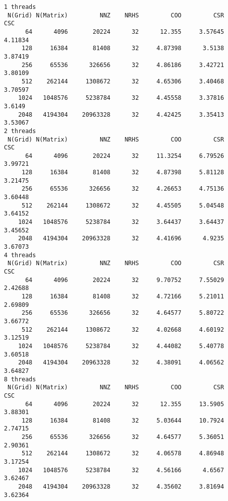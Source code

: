 \documentclass[]{article}
\begin{document}
    \begin{lstlisting}
1 threads   
 N(Grid) N(Matrix)         NNZ    NRHS         COO         CSR         CSC
      64      4096       20224      32      12.355     3.57645     4.11834
     128     16384       81408      32     4.87398      3.5138     3.87419
     256     65536      326656      32     4.86186     3.42721     3.80109
     512    262144     1308672      32     4.65306     3.40468     3.70597
    1024   1048576     5238784      32     4.45558     3.37816      3.6149
    2048   4194304    20963328      32     4.42425     3.35413     3.53067
2 threads   
 N(Grid) N(Matrix)         NNZ    NRHS         COO         CSR         CSC
      64      4096       20224      32     11.3254     6.79526     3.99721
     128     16384       81408      32     4.87398     5.81128     3.21475
     256     65536      326656      32     4.26653     4.75136     3.60448
     512    262144     1308672      32     4.45505     5.04548     3.64152
    1024   1048576     5238784      32     3.64437     3.64437     3.45652
    2048   4194304    20963328      32     4.41696      4.9235     3.67073
4 threads   
 N(Grid) N(Matrix)         NNZ    NRHS         COO         CSR         CSC
      64      4096       20224      32     9.70752     7.55029     2.42688
     128     16384       81408      32     4.72166     5.21011     2.69809
     256     65536      326656      32     4.64577     5.80722     3.66772
     512    262144     1308672      32     4.02668     4.60192     3.12519
    1024   1048576     5238784      32     4.44082     5.40778     3.60518
    2048   4194304    20963328      32     4.38091     4.06562     3.64827
8 threads   
 N(Grid) N(Matrix)         NNZ    NRHS         COO         CSR         CSC
      64      4096       20224      32      12.355     13.5905     3.88301
     128     16384       81408      32     5.03644     10.7924     2.74715
     256     65536      326656      32     4.64577     5.36051     2.90361
     512    262144     1308672      32     4.06578     4.86948     3.17254
    1024   1048576     5238784      32     4.56166      4.6567     3.62467
    2048   4194304    20963328      32     4.35602     3.81694     3.62364
    \end{lstlisting}
\end{document}
